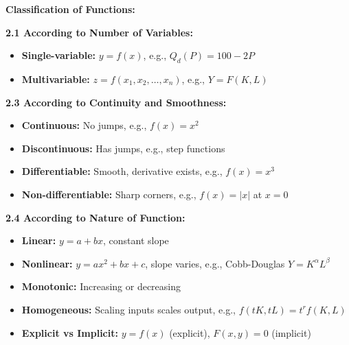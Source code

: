\begin{tcolorbox}[sectionbox]
\textbf{Classification of Functions:}

\textbf{2.1 According to Number of Variables:}
\begin{itemize}
    \item \textbf{Single-variable:} $y = f(x)$, e.g., $Q_d(P) = 100 - 2P$
    \item \textbf{Multivariable:} $z = f(x_1, x_2, \dots, x_n)$, e.g., $Y = F(K,L)$
\end{itemize}


\textbf{2.3 According to Continuity and Smoothness:}
\begin{itemize}
    \item \textbf{Continuous:} No jumps, e.g., $f(x)=x^2$
    \item \textbf{Discontinuous:} Has jumps, e.g., step functions
    \item \textbf{Differentiable:} Smooth, derivative exists, e.g., $f(x)=x^3$
    \item \textbf{Non-differentiable:} Sharp corners, e.g., $f(x)=|x|$ at $x=0$
\end{itemize}

\textbf{2.4 According to Nature of Function:}
\begin{itemize}
    \item \textbf{Linear:} $y = a + bx$, constant slope
    \item \textbf{Nonlinear:} $y = ax^2 + bx + c$, slope varies, e.g., Cobb-Douglas $Y = K^\alpha L^\beta$
    \item \textbf{Monotonic:} Increasing or decreasing
    \item \textbf{Homogeneous:} Scaling inputs scales output, e.g., $f(tK,tL)=t^r f(K,L)$
    \item \textbf{Explicit vs Implicit:} $y=f(x)$ (explicit), $F(x,y)=0$ (implicit)
\end{itemize}
\end{tcolorbox}

